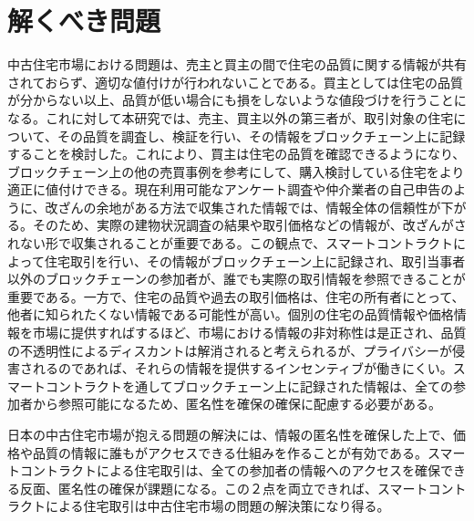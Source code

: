 \documentclass[a4paper,fontsize=11pt,report,notitlepage,line_length=38zw,number_of_lines=40,dvipdfmx]{jlreq}
\begin{document}
\section{解くべき問題}
中古住宅市場における問題は、売主と買主の間で住宅の品質に関する情報が共有されておらず、適切な値付けが行われないことである。買主としては住宅の品質が分からない以上、品質が低い場合にも損をしないような値段づけを行うことになる。これに対して本研究では、売主、買主以外の第三者が、取引対象の住宅について、その品質を調査し、検証を行い、その情報をブロックチェーン上に記録することを検討した。これにより、買主は住宅の品質を確認できるようになり、ブロックチェーン上の他の売買事例を参考にして、購入検討している住宅をより適正に値付けできる。現在利用可能なアンケート調査や仲介業者の自己申告のように、改ざんの余地がある方法で収集された情報では、情報全体の信頼性が下がる。そのため、実際の建物状況調査の結果や取引価格などの情報が、改ざんがされない形で収集されることが重要である。この観点で、スマートコントラクトによって住宅取引を行い、その情報がブロックチェーン上に記録され、取引当事者以外のブロックチェーンの参加者が、誰でも実際の取引情報を参照できることが重要である。一方で、住宅の品質や過去の取引価格は、住宅の所有者にとって、他者に知られたくない情報である可能性が高い。個別の住宅の品質情報や価格情報を市場に提供すればするほど、市場における情報の非対称性は是正され、品質の不透明性によるディスカントは解消されると考えられるが、プライバシーが侵害されるのであれば、それらの情報を提供するインセンティブが働きにくい。スマートコントラクトを通してブロックチェーン上に記録された情報は、全ての参加者から参照可能になるため、匿名性を確保の確保に配慮する必要がある。

日本の中古住宅市場が抱える問題の解決には、情報の匿名性を確保した上で、価格や品質の情報に誰もがアクセスできる仕組みを作ることが有効である。スマートコントラクトによる住宅取引は、全ての参加者の情報へのアクセスを確保できる反面、匿名性の確保が課題になる。この２点を両立できれば、スマートコントラクトによる住宅取引は中古住宅市場の問題の解決策になり得る。
\end{document}
